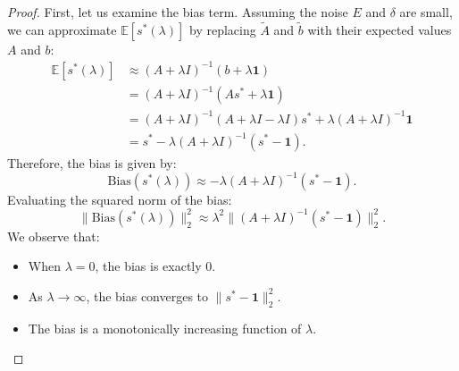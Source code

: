 \documentclass{article}
\theoremstyle{plain}
\theoremstyle{definition}
\theoremstyle{remark}
\begin{document}
\begin{proof}
First, let us examine the bias term. Assuming the noise $E$ and $\delta$ are small, we can approximate $\mathbb{E}[s^*(\lambda)]$ by replacing $\tilde{A}$ and $\tilde{b}$ with their expected values $A$ and $b$:
\begin{align}
    \mathbb{E}[s^*(\lambda)] &\approx (A + \lambda I)^{-1} (b + \lambda \mathbf{1}) \nonumber\\
    &= (A + \lambda I)^{-1} (A s^* + \lambda \mathbf{1}) \nonumber\\
    &= (A + \lambda I)^{-1} (A + \lambda I - \lambda I) s^* + \lambda (A + \lambda I)^{-1} \mathbf{1} \nonumber\\
    &= s^* - \lambda (A + \lambda I)^{-1} (s^* - \mathbf{1}).
\end{align}
Therefore, the bias is given by:
\begin{equation}
    \text{Bias}(s^*(\lambda)) \approx -\lambda (A + \lambda I)^{-1} (s^* - \mathbf{1}).
\end{equation}
Evaluating the squared norm of the bias:
\begin{equation}
    \|\text{Bias}(s^*(\lambda))\|_2^2 \approx \lambda^2 \|(A + \lambda I)^{-1} (s^* - \mathbf{1})\|_2^2.
\end{equation}
We observe that:
\begin{itemize}
    \item When $\lambda = 0$, the bias is exactly $0$.
    \item As $\lambda \to \infty$, the bias converges to $\|s^* - \mathbf{1}\|_2^2$.
    \item The bias is a monotonically increasing function of $\lambda$.
\end{itemize}


\end{proof}
\end{document}
